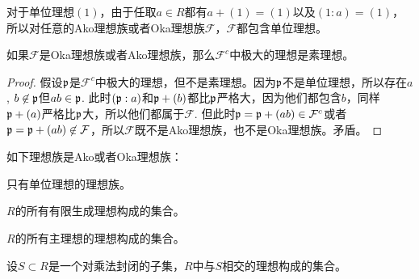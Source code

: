 对于单位理想$(1)$，由于任取$a\in R$都有$a+(1)=(1)$以及$(1:a)=(1)$，所以对任意的Ako理想族或者Oka理想族$\mathcal{F}$，$\mathcal{F}$都包含单位理想。

\begin{pro} 如果$\mathcal{F}$是Oka理想族或者Ako理想族，那么$\mathcal{F}^c$中极大的理想是素理想。
\end{pro}

\begin{proof}
	假设$\mathfrak{p}$是$\mathcal{F}^c$中极大的理想，但不是素理想。因为$\mathfrak{p}$不是单位理想，所以存在$a$, $b\not\in \mathfrak{p}$但$ab\in\mathfrak{p}$. 此时$(\mathfrak{p}:a)$和$\mathfrak{p}+(b)$都比$\mathfrak{p}$严格大，因为他们都包含$b$，同样$\mathfrak{p}+(a)$严格比$\mathfrak{p}$大，所以他们都属于$\mathcal{F}$. 但此时$\mathfrak{p}=\mathfrak{p}+(ab)\in \mathcal{F}^c$或者$\mathfrak{p}=\mathfrak{p}+(ab)\not\in \mathcal{F}$，所以$\mathcal{F}$既不是Ako理想族，也不是Oka理想族。矛盾。
\end{proof}


\begin{pro}
如下理想族是Ako或者Oka理想族：
\begin{compactenum}[~~~1.]
\item 只有单位理想的理想族。
\item $R$的所有有限生成理想构成的集合。
\item $R$的所有主理想的理想构成的集合。
\item 设$S\subset R$是一个对乘法封闭的子集，$R$中与$S$相交的理想构成的集合。
\end{compactenum}
\end{pro}

